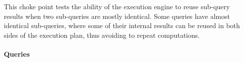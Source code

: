 
This choke point tests the ability of the execution engine to reuse sub-query results when two sub-queries are mostly identical.
Some queries have almost identical sub-queries, where some of their internal results can be reused in both sides of the execution plan, thus avoiding to repeat computations.


\paragraph{Queries}
{\raggedright

}